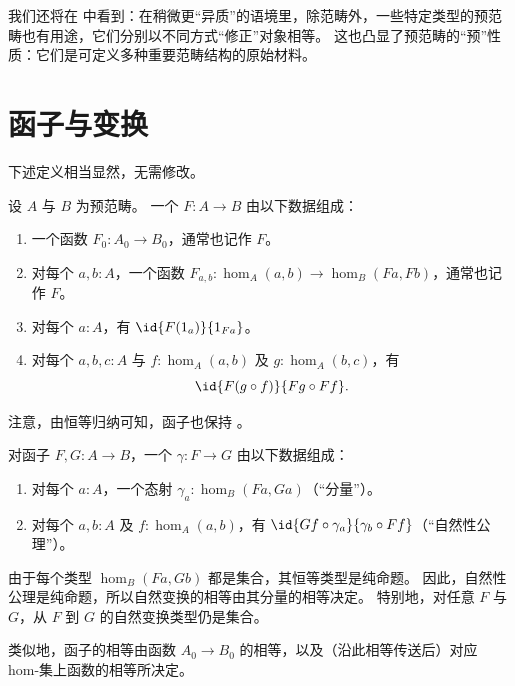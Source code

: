 我们还将在  中看到：在稍微更“异质”的语境里，除范畴外，一些特定类型的预范畴也有用途，它们分别以不同方式“修正”对象相等。
这也凸显了预范畴的“预”性质：它们是可定义多种重要范畴结构的原始材料。

\section{函子与变换}
\label{sec:transfors}

下述定义相当显然，无需修改。

\begin{defn}\label{ct:functor}
  设 $A$ 与 $B$ 为预范畴。
  一个
  $F:A\to B$ 由以下数据组成：
  \begin{enumerate}
  \item 一个函数 $F_0:A_0\to B_0$，通常也记作 $F$。
  \item 对每个 $a,b:A$，一个函数 $F_{a,b}:\hom_A(a,b) \to \hom_B(Fa,Fb)$，通常也记作 $F$。
  \item 对每个 $a:A$，有 $\id{F(1_a)}{1_{Fa}}$。
  \item 对每个 $a,b,c:A$ 与 $f:\hom_A(a,b)$ 及 $g:\hom_A(b,c)$，有
    \[\id{F(g\circ f)}{Fg\circ Ff}.\]\label{ct:functor:comp}
  \end{enumerate}
\end{defn}

注意，由恒等归纳可知，函子也保持 \idtoiso。

\begin{defn}\label{ct:nattrans}
  对函子 $F,G:A\to B$，一个
  $\gamma:F\to G$ 由以下数据组成：
  \begin{enumerate}
  \item 对每个 $a:A$，一个态射 $\gamma_a:\hom_B(Fa,Ga)$（“分量”）。
  \item 对每个 $a,b:A$ 及 $f:\hom_A(a,b)$，有 $\id{Gf\circ \gamma_a}{\gamma_b\circ Ff}$（“自然性公理”）。
  \end{enumerate}
\end{defn}

由于每个类型 $\hom_B(Fa,Gb)$ 都是集合，其恒等类型是纯命题。
因此，自然性公理是纯命题，所以自然变换的相等由其分量的相等决定。
特别地，对任意 $F$ 与 $G$，从 $F$ 到 $G$ 的自然变换类型仍是集合。

类似地，函子的相等由函数 $A_0\to B_0$ 的相等，以及（沿此相等传送后）对应 hom-集上函数的相等所决定。

